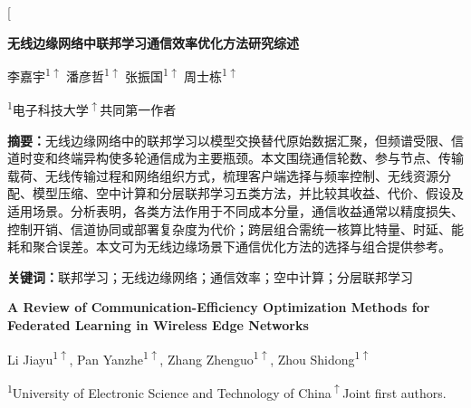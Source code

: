 \documentclass[UTF8,a4paper,twocolumn,zihao=5,fontset=none]{ctexart}
\newcommand{\PaperTitleZh}{无线边缘网络中联邦学习通信效率优化方法研究综述}
\newcommand{\PaperTitleEn}{A Review of Communication-Efficiency Optimization Methods for Federated Learning in Wireless Edge Networks}
\newcommand{\CoFirstMark}{\ensuremath{\uparrow}}
\newcommand{\AuthorZh}{%
  李嘉宇\textsuperscript{1\CoFirstMark}\hspace{2.2em}%
  潘彦哲\textsuperscript{1\CoFirstMark}\hspace{2.2em}%
  张振国\textsuperscript{1\CoFirstMark}\hspace{2.2em}%
  周士栋\textsuperscript{1\CoFirstMark}}
\newcommand{\AffiliationZh}{\textsuperscript{1}电子科技大学\qquad\textsuperscript{\CoFirstMark}共同第一作者}
\newcommand{\AuthorEn}{%
  Li Jiayu\textsuperscript{1\CoFirstMark},\hspace{0.9em}%
  Pan Yanzhe\textsuperscript{1\CoFirstMark},\hspace{0.9em}%
  Zhang Zhenguo\textsuperscript{1\CoFirstMark},\hspace{0.9em}%
  Zhou Shidong\textsuperscript{1\CoFirstMark}}
\newcommand{\AffiliationEn}{\textsuperscript{1}University of Electronic Science and Technology of China\qquad\textsuperscript{\CoFirstMark}Joint first authors.}
\begin{document}
\twocolumn[
  \begin{@twocolumnfalse}
    \begin{center}
      {\heiti\bfseries{}\PaperTitleZh\par}
      \vspace{0.65em}
      {\fangsongfont{}\AuthorZh\par}
      \vspace{0.25em}
      {\fangsongfont{}\AffiliationZh\par}
    \end{center}

    \vspace{0.45em}
    \begin{minipage}{\textwidth}
      \fangsongfont{}
      \noindent\textbf{摘要：}无线边缘网络中的联邦学习以模型交换替代原始数据汇聚，但频谱受限、信道时变和终端异构使多轮通信成为主要瓶颈。本文围绕通信轮数、参与节点、传输载荷、无线传输过程和网络组织方式，梳理客户端选择与频率控制、无线资源分配、模型压缩、空中计算和分层联邦学习五类方法，并比较其收益、代价、假设及适用场景。分析表明，各类方法作用于不同成本分量，通信收益通常以精度损失、控制开销、信道协同或部署复杂度为代价；跨层组合需统一核算比特量、时延、能耗和聚合误差。本文可为无线边缘场景下通信优化方法的选择与组合提供参考。

      \noindent\textbf{关键词：}联邦学习；无线边缘网络；通信效率；空中计算；分层联邦学习
    \end{minipage}

    \vspace{0.45em}
    \begin{center}
      {\rmfamily\bfseries\fontsize{14pt}{17pt}\selectfont\PaperTitleEn\par}
      \vspace{0.3em}
      {\rmfamily\fontsize{10.5pt}{12.5pt}\selectfont\AuthorEn\par}
      {\rmfamily\fontsize{9pt}{11pt}\selectfont\AffiliationEn\par}
    \end{center}


\end{@twocolumnfalse}
\end{document}
